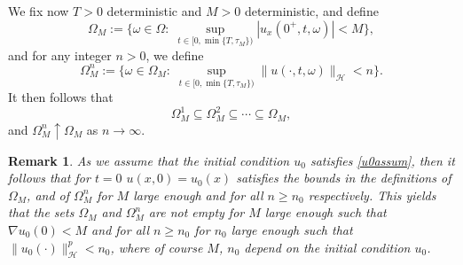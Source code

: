 \documentclass[reqno]{amsart}
\numberwithin{equation}{section}
\newtheorem{remark}[theorem]{Remark}
\begin{document}
We fix now $T>0$ deterministic and $M>0$ deterministic, and define
\begin{equation}\label{omm}
\Omega_M:=\Big\{\omega\in\Omega:\;\displaystyle{\sup_{t\in[0,\min\{T,\tau_M\})}}
|u_x(0^+,t,\omega)|< M\Big\},
\end{equation}
and for any integer $n>0$, we define
\begin{equation}\label{ommn}
\Omega_M^n:=\Big\{\omega\in\Omega_M:\;\displaystyle{\sup_{t\in[0,\min\{T,\tau_M\})}}
\|u(\cdot,t,\omega)\|_{\mathcal{H}}<n\Big\}.
\end{equation}
It then follows that
$$\Omega_M^1\subseteq\Omega_M^2\subseteq\cdots\subseteq
\Omega_M,$$
and
$ \Omega_M^n\uparrow\Omega_M$ as
$n\rightarrow\infty$.
\begin{remark}\label{nonemp}
As we assume that the initial condition $u_0$ satisfies \eqref{u0assum}, then it follows that for $t=0$ $u(x,0)=u_0(x)$ satisfies the bounds in the definitions of $\Omega_M$, and of $ \Omega_M^n $ for $M$ large enough and for all $n\geq n_0 $ respectively. This yields that the sets $\Omega_M$ and $\Omega_M^n$ are not empty for $M$ large enough such that $\nabla u_0(0)< M$ and for all $n\geq n_0$ for $n_0$ large enough such that $\|u_0(\cdot)\|_{\mathcal{H}}^p<n_0$, where of course $M$, $n_0$ depend on the initial condition $u_0$.
\end{remark}
\end{document}
